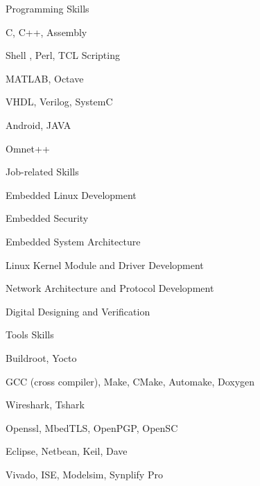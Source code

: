 

\begin{cvskills}

  \cvskill
    {Programming Skills} %
    {\begin{cvitems_3} %
        \item {C, C++, Assembly}
        \item {Shell , Perl, TCL Scripting}
        \item {MATLAB, Octave}
        \item {VHDL, Verilog, SystemC}
        \item {Android, JAVA}
        \item {Omnet++}
      \end{cvitems_3}} %

  \cvskill
    {Job-related Skills} %
    {\begin{cvitems_3} %
        \item {Embedded Linux Development}
        \item {Embedded Security}
        \item {Embedded System Architecture}
        \item {Linux Kernel Module and Driver Development}
        \item {Network Architecture and Protocol Development}
        \item {Digital Designing and Verification}
      \end{cvitems_3}} %
      
  \cvskill
    {Tools Skills} %
    {\begin{cvitems_3} %
        \item {Buildroot, Yocto }
        \item {GCC (cross compiler), Make, CMake, Automake, Doxygen}
        \item {Wireshark, Tshark}
        \item {Openssl, MbedTLS, OpenPGP, OpenSC}
        \item {Eclipse, Netbean, Keil, Dave}
        \item {Vivado, ISE, Modelsim, Synplify Pro}
      \end{cvitems_3}} %
      

\end{cvskills}
